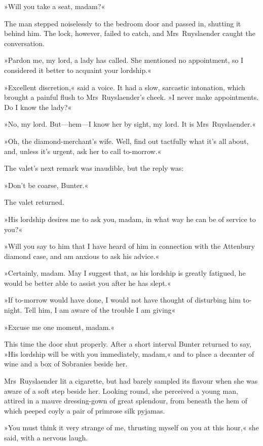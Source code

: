 »Will you take a seat, madam?«

The man stepped noiselessly to the bedroom door and passed in, shutting it behind him. The lock, however, failed to catch, and Mrs~Ruyslaender caught the conversation.

»Pardon me, my lord, a lady has called. She mentioned no appointment, so I considered it better to acquaint your lordship.«

»Excellent discretion,« said a voice. It had a slow, sarcastic intonation, which brought a painful flush to Mrs~Ruyslaender's cheek. »I never make appointments. Do I know the lady?«

»No, my lord. But—hem—I know her by sight, my lord. It is Mrs~Ruyslaender.«

»Oh, the diamond-merchant's wife. Well, find out tactfully what it's all about, and, unless it's urgent, ask her to call to-morrow.«

The valet's next remark was inaudible, but the reply was:

»Don't be coarse, Bunter.«

The valet returned.

»His lordship desires me to ask you, madam, in what way he can be of service to you?«

»Will you say to him that I have heard of him in connection with the Attenbury diamond case, and am anxious to ask his advice.«

»Certainly, madam. May I suggest that, as his lordship is greatly fatigued, he would be better able to assist you after he has slept.«

»If to-morrow would have done, I would not have thought of disturbing him to-night. Tell him, I am aware of the trouble I am giving\longdash«

»Excuse me one moment, madam.«

This time the door shut properly. After a short interval Bunter returned to say, »His lordship will be with you immediately, madam,« and to place a decanter of wine and a box of Sobranies beside her.

Mrs~Ruyslaender lit a cigarette, but had barely sampled its flavour when she was aware of a soft step beside her. Looking round, she perceived a young man, attired in a mauve dressing-gown of great splendour, from beneath the hem of which peeped coyly a pair of primrose silk pyjamas.

»You must think it very strange of me, thrusting myself on you at this hour,« she said, with a nervous laugh.

